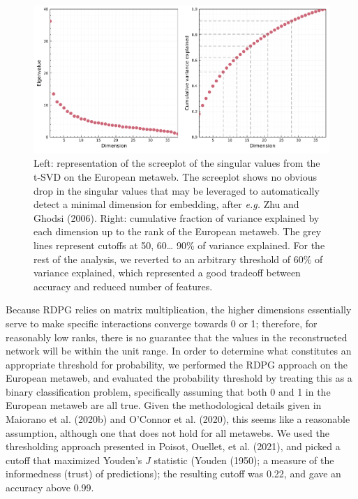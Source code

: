 \documentclass[10pt,oneside]{article}
\makeatletter
\def\maxwidth{\ifdim\Gin@nat@width>\linewidth\linewidth
\else\Gin@nat@width\fi}
\let\Oldincludegraphics\includegraphics
\renewcommand{\includegraphics}[1]{\Oldincludegraphics[width=\maxwidth]{#1}}
\makeatother
\begin{document}
\begin{figure}
\hypertarget{fig:scree}{%
\centering
\includegraphics{figures/figure-screeplot.png}
\caption{Left: representation of the screeplot of the singular values
from the t-SVD on the European metaweb. The screeplot shows no obvious
drop in the singular values that may be leveraged to automatically
detect a minimal dimension for embedding, after \emph{e.g.} Zhu and
Ghodsi (2006). Right: cumulative fraction of variance explained by each
dimension up to the rank of the European metaweb. The grey lines
represent cutoffs at 50, 60\ldots{} 90\% of variance explained. For the
rest of the analysis, we reverted to an arbitrary threshold of 60\% of
variance explained, which represented a good tradeoff between accuracy
and reduced number of features.}\label{fig:scree}
}
\end{figure}

Because RDPG relies on matrix multiplication, the higher dimensions
essentially serve to make specific interactions converge towards 0 or 1;
therefore, for reasonably low ranks, there is no guarantee that the
values in the reconstructed network will be within the unit range. In
order to determine what constitutes an appropriate threshold for
probability, we performed the RDPG approach on the European metaweb, and
evaluated the probability threshold by treating this as a binary
classification problem, specifically assuming that both 0 and 1 in the
European metaweb are all true. Given the methodological details given in
Maiorano et al. (2020b) and O'Connor et al. (2020), this seems like a
reasonable assumption, although one that does not hold for all metawebs.
We used the thresholding approach presented in Poisot, Ouellet, et al.
(2021), and picked a cutoff that maximized Youden's \(J\) statistic
(Youden (1950); a measure of the informedness (trust) of predictions);
the resulting cutoff was 0.22, and gave an accuracy above 0.99.
\end{document}
